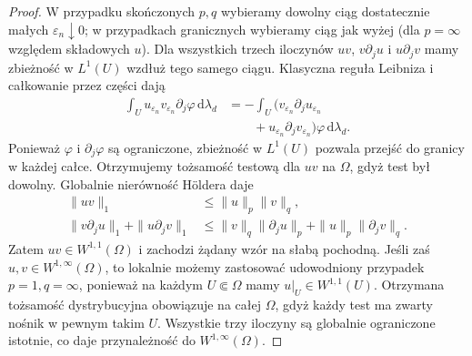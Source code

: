\begin{proof}
W przypadku skończonych $p,q$ wybieramy dowolny
ciąg dostatecznie małych $\varepsilon_n\downarrow0$;
w przypadkach granicznych wybieramy ciąg jak wyżej
(dla $p=\infty$ względem składowych $u$).
Dla wszystkich trzech iloczynów $uv$, $v\partial_j u$
i $u\partial_j v$ mamy zbieżność w $L^1(U)$
wzdłuż tego samego ciągu. Klasyczna reguła Leibniza
i całkowanie przez części dają
\[
 \begin{aligned}
 \int_U u_{\varepsilon_n}v_{\varepsilon_n}
                  \partial_j\varphi\,\mathrm d\lambda_d
 &=-\int_U(v_{\varepsilon_n}\partial_j u_{\varepsilon_n}\\
 &\qquad+u_{\varepsilon_n}\partial_j v_{\varepsilon_n})
                    \varphi\,\mathrm d\lambda_d .
 \end{aligned}
\]
Ponieważ $\varphi$ i $\partial_j\varphi$ są ograniczone,
zbieżność w $L^1(U)$ pozwala przejść do granicy
w każdej całce. Otrzymujemy tożsamość testową
dla $uv$ na $\Omega$, gdyż test był dowolny.
Globalnie nierówność Höldera daje
\[
 \begin{aligned}
 \|uv\|_1&\le\|u\|_p\|v\|_q,\\
 \|v\partial_j u\|_1+\|u\partial_j v\|_1
 &\le\|v\|_q\|\partial_j u\|_p+
       \|u\|_p\|\partial_j v\|_q.
 \end{aligned}
\]
Zatem $uv\in W^{1,1}(\Omega)$ i zachodzi
żądany wzór na słabą pochodną.
Jeśli zaś $u,v\in W^{1,\infty}(\Omega)$, to lokalnie
możemy zastosować udowodniony przypadek $p=1,q=\infty$,
ponieważ na każdym $U\Subset\Omega$ mamy $u|_U\in W^{1,1}(U)$.
Otrzymana tożsamość dystrybucyjna obowiązuje na całej
$\Omega$, gdyż każdy test ma zwarty nośnik w pewnym takim $U$.
Wszystkie trzy iloczyny są globalnie ograniczone istotnie,
co daje przynależność do $W^{1,\infty}(\Omega)$.
\end{proof}

